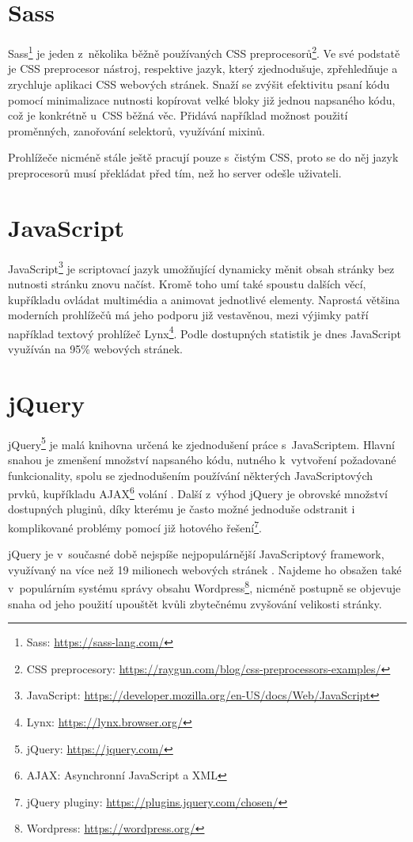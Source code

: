 \section{Sass}
Sass\footnote{Sass: \url{https://sass-lang.com/}} je jeden z~několika běžně používaných CSS preprocesorů\footnote{CSS preprocesory: \url{https://raygun.com/blog/css-preprocessors-examples/}}. Ve své podstatě je CSS preprocesor nástroj, respektive jazyk, který zjednodušuje, zpřehledňuje a zrychluje aplikaci CSS webových stránek. Snaží se zvýšit efektivitu psaní kódu pomocí minimalizace nutnosti kopírovat velké bloky již jednou napsaného kódu, což je konkrétně u~CSS běžná věc. Přidává například možnost použití proměnných, zanořování selektorů, využívání mixinů. 
\par Prohlížeče nicméně stále ještě pracují pouze s~čistým CSS, proto se do něj jazyk preprocesorů musí překládat před tím, než ho server odešle uživateli. 


\section{JavaScript}
JavaScript\footnote{JavaScript: \url{https://developer.mozilla.org/en-US/docs/Web/JavaScript}} je scriptovací jazyk umožňující dynamicky měnit obsah stránky bez nutnosti stránku znovu načíst. Kromě toho umí také spoustu dalších věcí, kupříkladu ovládat multimédia a animovat jednotlivé elementy. Naprostá většina moderních prohlížečů má jeho podporu již vestavěnou, mezi výjimky patří například textový prohlížeč Lynx\footnote{Lynx: \url{https://lynx.browser.org/}}. Podle dostupných statistik \cite{JAVASCRIPT-USAGE} je dnes JavaScript využíván na 95\% webových stránek.

\section{jQuery}
jQuery\footnote{jQuery: \url{https://jquery.com/}} je malá knihovna určená ke zjednodušení práce s~JavaScriptem. Hlavní snahou je zmenšení množství napsaného kódu, nutného k~vytvoření požadované funkcionality, spolu se zjednodušením používání některých JavaScriptových prvků, kupříkladu AJAX\footnote{AJAX: Asynchronní JavaScript a XML} volání \cite{JQUERY}. Další z~výhod jQuery je obrovské množství dostupných pluginů, díky kterému je často možné jednoduše odstranit i komplikované problémy pomocí již hotového řešení\footnote{jQuery pluginy: \url{https://plugins.jquery.com/chosen/}}.  
\par jQuery je v~současné době nejspíše nejpopulárnější JavaScriptový framework, využívaný na více než 19 milionech webových stránek \cite{JQUERY-USAGE}. Najdeme ho obsažen také v~populárním systému správy obsahu Wordpress\footnote{Wordpress: \url{https://wordpress.org/}}, nicméně postupně se objevuje snaha od jeho použití upouštět kvůli zbytečnému zvyšování velikosti stránky.

